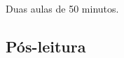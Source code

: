 \documentclass[12pt]{extarticle}
\begin{document}
 Duas aulas de 50 minutos.

\subsection{Pós-leitura}









\end{document}
